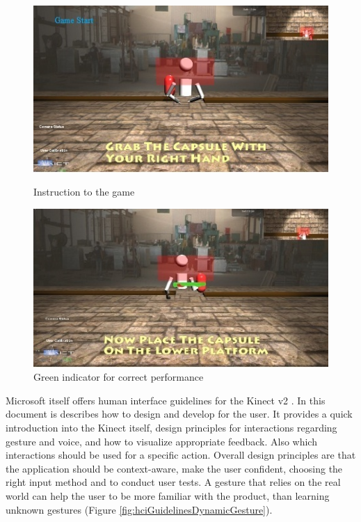 \begin{figure}[htb]
	\centering
	\begin{minipage}[t]{0.49\linewidth}
		\centering
		\includegraphics[width=1\linewidth]{Pictures/gameInstruction}
		\caption{Instruction to the game \cite{Chang2012-hz}}
		\label{fig:gameInstruction}
	\end{minipage}
	\hfill
	\begin{minipage}[t]{0.49\linewidth}
		\centering
		\includegraphics[width=1\linewidth]{Pictures/gameHighlighting}
		\caption{Green indicator for correct performance \cite{Chang2012-hz}}
		\label{fig:gameHighlighting}
	\end{minipage}
\end{figure}

Microsoft itself offers human interface guidelines for the Kinect v2 \cite{MicrosoftHIG2014-mh}. In this document is describes how to design and develop for the user. It provides a quick introduction into the Kinect itself, design principles for interactions regarding gesture and voice, and how to visualize appropriate feedback. Also which interactions should be used for a specific action. Overall design principles are that the application should be context-aware, make the user confident, choosing the right input method and to conduct user tests. A gesture that relies on the real world can help the user to be more familiar with the product, than learning unknown gestures (Figure \ref{fig:hciGuidelinesDynamicGesture}).

